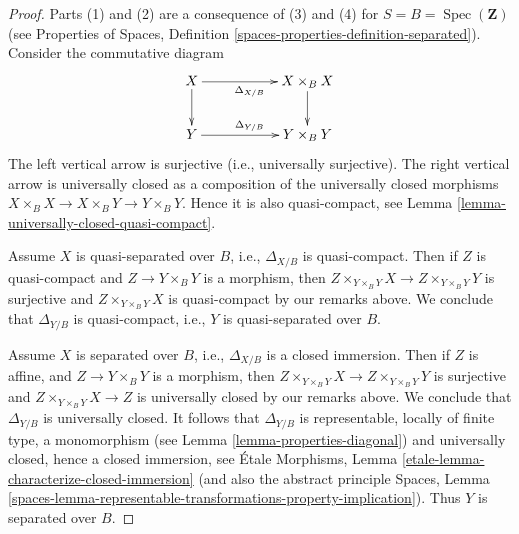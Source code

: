 \documentclass[10pt,a4paper]{amsart}
\theoremstyle{plain}
\theoremstyle{definition}
\theoremstyle{remark}
\numberwithin{equation}{subsection}
\def\Spec{\mathop{\mathrm{Spec}}}
\begin{document}
\begin{proof}
Parts (1) and (2) are a consequence of (3) and (4) for
$S = B = \Spec(\mathbf{Z})$ (see
Properties of Spaces,
Definition \ref{spaces-properties-definition-separated}).
Consider the commutative diagram
$$
\xymatrix{
X \ar[d] \ar[rr]_{\Delta_{X/B}} & & X \times_B X \ar[d] \\
Y \ar[rr]^{\Delta_{Y/B}} & & Y \times_B Y
}
$$
The left vertical arrow is surjective (i.e., universally surjective).
The right vertical arrow is universally closed as a composition
of the universally closed morphisms
$X \times_B X \to X \times_B Y \to Y \times_B Y$. Hence it is also
quasi-compact, see
Lemma \ref{lemma-universally-closed-quasi-compact}.

\medskip\noindent
Assume $X$ is quasi-separated over $B$, i.e.,  $\Delta_{X/B}$ is
quasi-compact. Then if $Z$ is quasi-compact and $Z \to Y \times_B Y$ is
a morphism, then $Z \times_{Y \times_B Y} X \to Z \times_{Y \times_B Y} Y$
is surjective and $Z \times_{Y \times_B Y} X$ is quasi-compact by our remarks
above. We conclude that $\Delta_{Y/B}$ is quasi-compact, i.e., $Y$
is quasi-separated over $B$.

\medskip\noindent
Assume $X$ is separated over $B$, i.e., $\Delta_{X/B}$ is a closed
immersion. Then if $Z$ is affine, and $Z \to Y \times_B Y$ is
a morphism, then $Z \times_{Y \times_B Y} X \to Z \times_{Y \times_B Y} Y$
is surjective and $Z \times_{Y \times_B Y} X \to Z$ is universally closed
by our remarks above. We conclude that $\Delta_{Y/B}$ is universally closed.
It follows that $\Delta_{Y/B}$ is representable, locally of finite type, a
monomorphism (see
Lemma \ref{lemma-properties-diagonal})
and universally closed, hence a closed immersion, see
\'Etale Morphisms,
Lemma \ref{etale-lemma-characterize-closed-immersion}
(and also the abstract principle
Spaces, Lemma
\ref{spaces-lemma-representable-transformations-property-implication}).
Thus $Y$ is separated over $B$.
\end{proof}
\end{document}
